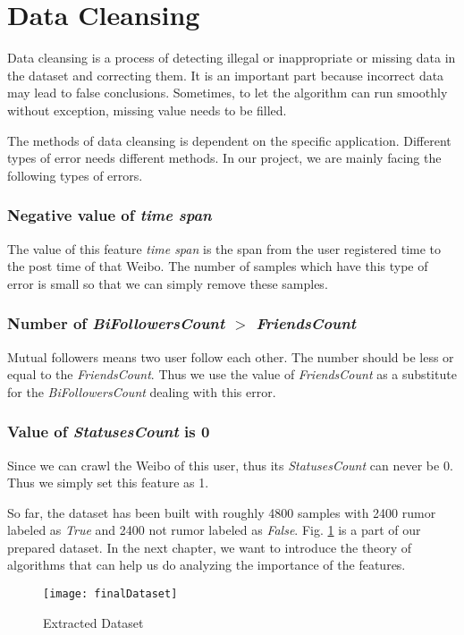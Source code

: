 \section{Data Cleansing}
Data cleansing is a process of detecting illegal or inappropriate or missing data in the dataset and correcting them. It is an important part because incorrect data may lead to false conclusions. Sometimes, to let the algorithm can run smoothly without exception, missing value needs to be filled.

The methods of data cleansing is dependent on the specific application. Different types of error needs different methods. In our project, we are mainly facing the following types of errors.
\subsubsection{Negative value of \textit{time span}}
The value of this feature \textit{time span} is the span from the user registered time to the post time of that Weibo. The number of samples which have this type of error is small so that we can simply remove these samples.

\subsubsection{Number of \textit{BiFollowersCount $>$ FriendsCount}}
Mutual followers means two user follow each other. The number should be less or equal to the \textit{FriendsCount}. Thus we use the value of \textit{FriendsCount} as a substitute for the \textit{BiFollowersCount} dealing with this error.

\subsubsection{Value of \textit{StatusesCount} is 0}
Since we can crawl the Weibo of this user, thus its \textit{StatusesCount} can never be 0. Thus we simply set this feature as 1.


So far, the dataset has been built with roughly 4800 samples with 2400 rumor labeled as \textit{True} and 2400 not rumor labeled as \textit{False}. Fig. \ref{fig:finalDataset} is a part of our prepared dataset. In the next chapter, we want to introduce the theory of algorithms that can help us do analyzing the importance of the features.

\begin{figure}[h]\centering 
\texttt{[image: finalDataset]}
\caption{Extracted Dataset}\label{fig:finalDataset} 
\end{figure}






